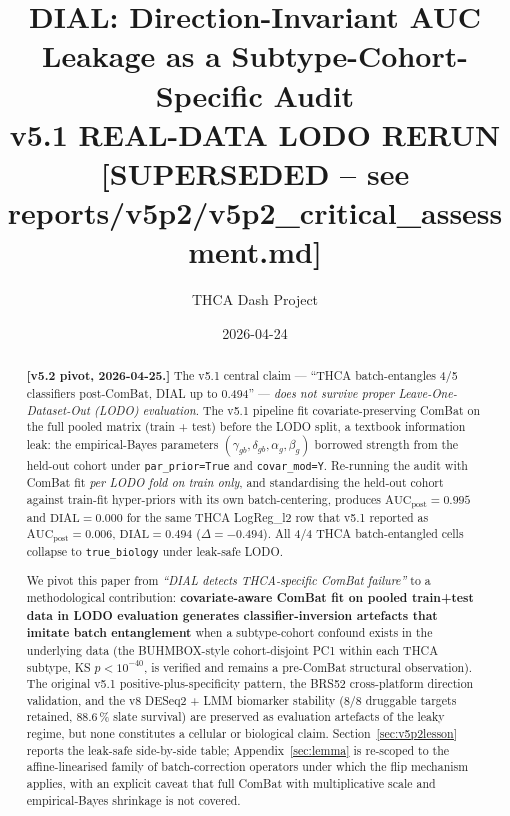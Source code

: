 \documentclass[11pt,a4paper]{article}
\title{DIAL: Direction-Invariant AUC Leakage as a Subtype-Cohort-Specific Audit \\ \large v5.1 REAL-DATA LODO RERUN \\ \large \textbf{[SUPERSEDED -- see reports/v5p2/v5p2\_critical\_assessment.md]}}
\author{THCA Dash Project}
\date{2026-04-24}
\begin{document}
\maketitle
\begin{abstract}
\textbf{[v5.2 pivot, 2026-04-25.]}
The v5.1 central claim --- ``THCA batch-entangles 4/5 classifiers
post-ComBat, DIAL up to 0.494'' --- \emph{does not survive proper
Leave-One-Dataset-Out (LODO) evaluation}. The v5.1 pipeline fit
covariate-preserving ComBat on the full pooled matrix (train + test)
before the LODO split, a textbook information leak: the empirical-Bayes
parameters $(\gamma_{gb}, \delta_{gb}, \alpha_g, \beta_g)$ borrowed
strength from the held-out cohort under \texttt{par\_prior=True} and
\texttt{covar\_mod=Y}. Re-running the audit with ComBat fit \emph{per
LODO fold on train only}, and standardising the held-out cohort
against train-fit hyper-priors with its own batch-centering, produces
$\mathrm{AUC}_{\mathrm{post}} = 0.995$ and $\mathrm{DIAL} = 0.000$ for
the same THCA LogReg\_l2 row that v5.1 reported as
$\mathrm{AUC}_{\mathrm{post}} = 0.006$, $\mathrm{DIAL} = 0.494$
($\Delta = -0.494$). All 4/4 THCA batch-entangled cells collapse to
\texttt{true\_biology} under leak-safe LODO.

We pivot this paper from \emph{``DIAL detects THCA-specific ComBat
failure''} to a methodological contribution: \textbf{covariate-aware
ComBat fit on pooled train+test data in LODO evaluation generates
classifier-inversion artefacts that imitate batch entanglement} when a
subtype-cohort confound exists in the underlying data (the BUHMBOX-style
cohort-disjoint PC1 within each THCA subtype, KS $p < 10^{-40}$, is
verified and remains a pre-ComBat structural observation). The original
v5.1 positive-plus-specificity pattern, the BRS52 cross-platform
direction validation, and the v8 DESeq2 + LMM biomarker stability
(8/8 druggable targets retained, 88.6\,\% slate survival) are preserved
as evaluation artefacts of the leaky regime, but none constitutes a
cellular or biological claim. Section~\ref{sec:v5p2lesson} reports the
leak-safe side-by-side table; Appendix~\ref{sec:lemma} is re-scoped to
the affine-linearised family of batch-correction operators under which
the flip mechanism applies, with an explicit caveat that full ComBat
with multiplicative scale and empirical-Bayes shrinkage is not covered.
\end{abstract}
\end{document}
